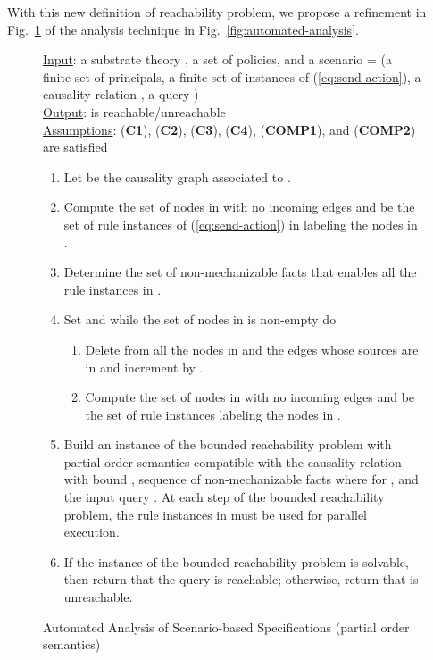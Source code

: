 \documentclass[conference]{llncs}
\begin{document}
{With this new definition of reachability problem, we propose a
refinement in Fig.~\ref{fig:automated-analysis-refinement} of the
analysis technique in Fig.~\ref{fig:automated-analysis}.
\begin{figure}[t]
\centering
\begin{minipage}{\textwidth}
\underline{\textsf{Input}}: a substrate theory , a set
 of policies, and a scenario
 = (a finite set  of
principals, a finite set  of instances of (\ref{eq:send-action}), a causality relation , a query )\\
\underline{\textsf{Output}}:  is reachable/unreachable\\
\underline{\textsf{Assumptions}}:   (\textbf{C1}), (\textbf{C2}),
(\textbf{C3}), (\textbf{C4}), (\textbf{COMP1}), and (\textbf{COMP2}) are satisfied
\begin{enumerate}
\item Let  be the causality graph associated to
  .
\item Compute the set  of nodes in  with no
  incoming edges and  be the set of rule instances of
  (\ref{eq:send-action}) in  labeling the nodes in .
\item Determine the set  of non-mechanizable facts that enables
  all the rule instances in .
\item Set  and while the set of nodes in  is
  non-empty do
  \begin{enumerate}
    \item Delete from  all the nodes in  and the
      edges whose sources are in  and increment  by .
    \item Compute the set  of nodes in  with no
      incoming edges and  be the set of rule
      instances labeling the nodes in .  
  \end{enumerate}
\item Build an instance of the bounded reachability problem with
  partial order semantics compatible with the causality relation
   with bound , sequence  of
  non-mechanizable facts where  for , and the input query .  At each step  of the bounded
  reachability problem, the rule instances in  must be used
  for parallel execution.
\item If the instance of the bounded reachability problem is solvable,
  then return that the query  is reachable; otherwise, return that
   is unreachable.
\end{enumerate}
\end{minipage}
\caption{\label{fig:automated-analysis-refinement}Automated Analysis of Scenario-based Specifications (partial order semantics)}

\end{figure}}
\end{document}
